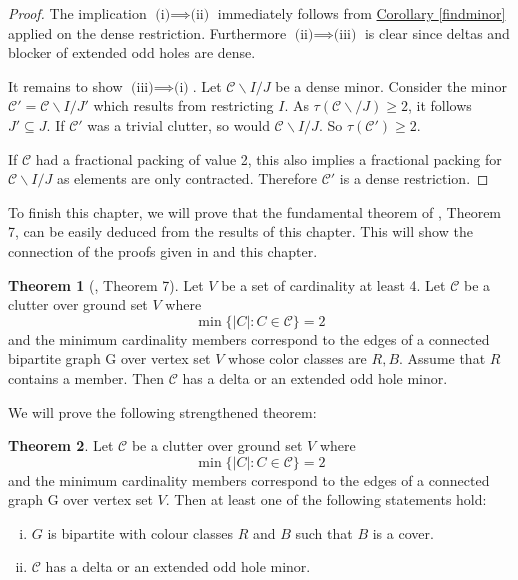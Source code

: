 \documentclass[a4paper, 12pt]{scrbook}
\theoremstyle{definition}
\newtheorem{theorem}{Theorem}[chapter]
\begin{document}
   \begin{proof}
       The implication $\text{(i)} \implies \text{(ii)}$ immediately follows from \hyperref[findminor]{Corollary \ref*{findminor}} applied on the dense restriction. Furthermore $\text{(ii)} \implies \text{(iii)}$ is clear since deltas and blocker of extended odd holes are dense.

       It remains to show $\text{(iii)} \implies \text{(i)}$. Let $\mathcal{C} \backslash I /J$ be a dense minor. Consider the minor $\mathcal{C'}=\mathcal{C}\backslash I/J'$ which results from restricting $I$. As $\tau(\mathcal{C}\backslash /J)\geq 2$, it follows $J' \subseteq J$. If $\mathcal{C'}$ was a trivial clutter, so would $\mathcal{C} \backslash I/J$. So $\tau(\mathcal{C'})\geq 2$.

       If $\mathcal{C}$ had a fractional packing of value 2, this also implies a fractional packing for $\mathcal{C}\backslash I/J$ as elements are only contracted. Therefore $\mathcal{C'}$ is a dense restriction.
   \end{proof}

   To finish this chapter, we will prove that the fundamental theorem of \cite{deltas}, Theorem 7, can be easily deduced from the results of this chapter. This will show the connection of the proofs given in \cite{deltas} and this chapter.

   \begin{theorem}[\cite{deltas}, Theorem 7]
       Let $V$ be a set of cardinality at least 4. Let $\mathcal{C}$ be a clutter over ground set $V$ where
       \[
           \min\{|C|: C \in \mathcal{C}\} = 2
           \]
           and the minimum cardinality members correspond to the edges of a connected bipartite graph G over vertex set $V$ whose color classes are $R,B$. Assume that $R$ contains a member. Then $\mathcal{C}$ has a delta or an extended odd hole minor.
   \end{theorem}

   We will prove the following strengthened theorem:
   \begin{theorem}
       Let $\mathcal{C}$ be a clutter over ground set $V$ where
       \[
           \min\{|C|: C \in \mathcal{C}\} = 2
           \]
           and the minimum cardinality members correspond to the edges of a connected graph G over vertex set $V$.
           Then at least one of the following statements hold:
           \leavevmode
           \begin{enumerate}[(i)]
               \item $G$ is bipartite with colour classes $R$ and $B$ such that $B$ is a cover.
               \item $\mathcal{C}$ has a delta or an extended odd hole minor.
           \end{enumerate}
    \end{theorem}
\end{document}

